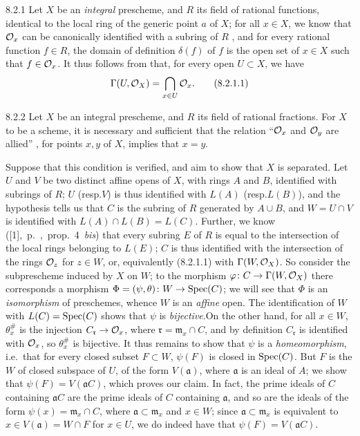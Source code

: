 
\begin{env}{8.2.1}
\label{env-1.8.2.1}
Let $X$ be an \emph{integral} prescheme, and $R$ its field of
rational functions, identical to the local ring of the generic point $a$ of $X$;
for all $x\in X$, we know that $\mathcal{O}_x$ can be canonically identified with a
subring of $R$ , and for every rational function $f\in R$, the
domain of definition $\delta(f)$ of $f$ is the open set of $x\in X$ such that
$f\in\mathcal{O}_x$. It thus follows from  that, for every open $U\subset X$,
we have
\[
  \Gamma(U,\mathcal{O}_X)=\bigcap_{x\in U}\mathcal{O}_x.\tag{8.2.1.1}
\]
\end{env}

\begin{env}[Proposition]{8.2.2}
\label{prop-1.8.2.2}
Let $X$ be an integral prescheme,
and $R$ its field of rational fractions. For $X$ to be a scheme, it is
necessary and sufficient that the relation ``$\mathcal{O}_x$ and $\mathcal{O}_y$ are allied''
, for points $x,y$ of $X$, implies that $x=y$.
\end{env}

Suppose that this condition is verified, and aim to show that $X$ is separated.
Let $U$ and $V$ be two distinct affine opens of $X$, with rings $A$ and $B$,
identified with subrings of $R$; $U$ (resp.$V$) is thus identified 
with $L(A)$ (resp.$L(B)$), and the hypothesis tells us  that $C$ is
the subring of $R$ generated by $A\cup B$, and $W=U\cap V$ is identified with
$L(A)\cap L(B)=L(C)$. Further, we know
([1],~p.~,~prop.~4~\emph{bis}) that every subring $E$ of $R$ is
equal to the intersection of the local rings belonging to $L(E)$; $C$ is thus
identified with the intersection of the rings $\mathcal{O}_z$ for $z\in W$, or,
equivalently (8.2.1.1) with $\Gamma(W,\mathcal{O}_X)$. So consider the subprescheme
induced by $X$ on $W$; to the  morphism $\varphi\colon
C\to\Gamma(W,\mathcal{O}_X)$ there corresponds  a morphism
$\Phi=(\psi,\theta)\colon W\to\operatorname{Spec}(C)$; we will see that $\Phi$ is an
\emph{isomorphism} of preschemes, whence $W$ is an \emph{affine} open. The
identification of $W$ with $L(C)=\operatorname{Spec}(C)$ shows that $\psi$ is
\emph{bijective}.On the other hand, for all $x\in W$, $\theta_x^\#$ is the
injection $C_\mathfrak{r}\to\mathcal{O}_x$, where $\mathfrak{r}=\mathfrak{m}_x\cap C$,
and by definition $C_\mathfrak{r}$ is identified with $\mathcal{O}_x$, so $\theta_x^\#$
is bijective. It thus remains to show that $\psi$ is a \emph{homeomorphism},
i.e.\ that for every closed subset $F\subset W$, $\psi(F)$ is closed in
$\operatorname{Spec}(C)$. But $F$ is the  $W$ of closed subspace of $U$,
of the form $V(\mathfrak{a})$, where $\mathfrak{a}$ is an ideal of $A$; we show
that $\psi(F)=V(\mathfrak{a}C)$, which proves our claim. In fact, the prime
ideals of $C$ containing $\mathfrak{a}C$ are the prime ideals of $C$ containing
$\mathfrak{a}$, and so are the ideals of the form $\psi(x)=\mathfrak{m}_x\cap
C$, where $\mathfrak{a}\subset\mathfrak{m}_x$ and $x\in W$; since
$\mathfrak{a}\subset\mathfrak{m}_x$ is equivalent to $x\in V(\mathfrak{a})=W\cap
F$ for $x\in U$, we do indeed have that $\psi(F)=V(\mathfrak{a}C)$.

